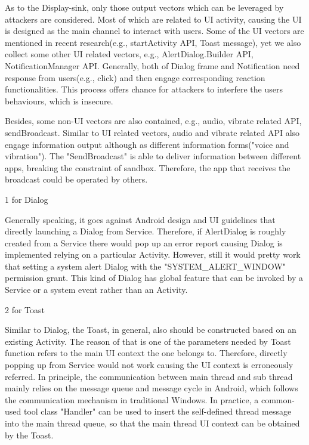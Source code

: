 \documentclass{sig-alternate-05-2015}
\begin{document}
As to the Display-sink, only those output vectors which can be leveraged by attackers are considered. Most of which are related to UI activity, causing the UI is designed as the main channel to interact with users. Some of the UI vectors are mentioned in recent research\cite{bianchi2015app}(e.g., startActivity API, Toast message), yet we also collect some other UI related vectors, e.g., AlertDialog.Builder API, NotificationManager API. Generally, both of Dialog frame and Notification need response from users(e.g., click) and then engage corresponding reaction functionalities. This process offers chance for attackers to interfere the users behaviours, which is insecure.

Besides, some non-UI vectors are also contained, e.g., audio, vibrate related API, sendBroadcast. Similar to UI related vectors, audio and vibrate related API also engage information output although as different information forms("voice and vibration"). The "SendBroadcast" is able to deliver information between different apps, breaking the constraint of sandbox. Therefore, the app that receives the broadcast could be operated by others.  


1 for Dialog

Generally speaking, it goes against Android design and UI guidelines that directly launching a Dialog from Service. Therefore, if AlertDialog is roughly created from a Service there would pop up an error report causing Dialog is implemented relying on a particular Activity. However, still it would pretty work that setting a system alert Dialog with the "SYSTEM\_ALERT\_WINDOW" permission grant. This kind of Dialog has global feature that can be invoked by a Service or a system event rather than an Activity. 

2 for Toast

Similar to Dialog, the Toast, in general, also should be constructed based on an existing Activity. The reason of that is one of the parameters needed by Toast function refers to the main UI context the one belongs to. Therefore, directly popping up from Service would not work causing the UI context is erroneously referred. In principle, the communication between main thread and sub thread mainly relies on the message queue and message cycle in Android, which follows the communication mechanism in traditional Windows. In practice, a common-used tool class "Handler" can be used to insert the self-defined thread message into the main thread queue, so that the main thread UI context can be obtained by the Toast.
\end{document}
